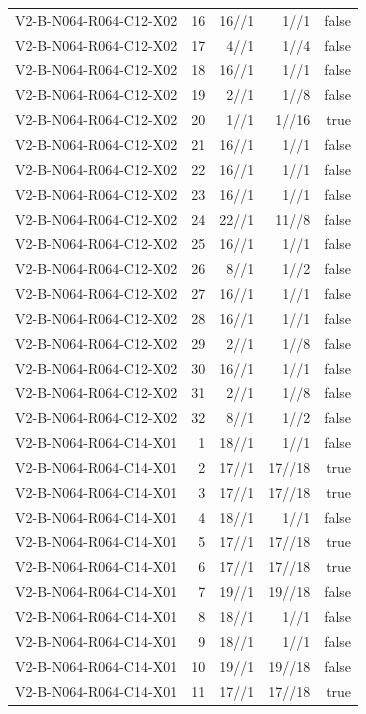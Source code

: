 {\begin{longtable}{lrrrr}
V2-B-N064-R064-C12-X02 & 16 & 16//1 & 1//1 & false \\
V2-B-N064-R064-C12-X02 & 17 & 4//1 & 1//4 & false \\
V2-B-N064-R064-C12-X02 & 18 & 16//1 & 1//1 & false \\
V2-B-N064-R064-C12-X02 & 19 & 2//1 & 1//8 & false \\
V2-B-N064-R064-C12-X02 & 20 & 1//1 & 1//16 & true \\
V2-B-N064-R064-C12-X02 & 21 & 16//1 & 1//1 & false \\
V2-B-N064-R064-C12-X02 & 22 & 16//1 & 1//1 & false \\
V2-B-N064-R064-C12-X02 & 23 & 16//1 & 1//1 & false \\
V2-B-N064-R064-C12-X02 & 24 & 22//1 & 11//8 & false \\
V2-B-N064-R064-C12-X02 & 25 & 16//1 & 1//1 & false \\
V2-B-N064-R064-C12-X02 & 26 & 8//1 & 1//2 & false \\
V2-B-N064-R064-C12-X02 & 27 & 16//1 & 1//1 & false \\
V2-B-N064-R064-C12-X02 & 28 & 16//1 & 1//1 & false \\
V2-B-N064-R064-C12-X02 & 29 & 2//1 & 1//8 & false \\
V2-B-N064-R064-C12-X02 & 30 & 16//1 & 1//1 & false \\
V2-B-N064-R064-C12-X02 & 31 & 2//1 & 1//8 & false \\
V2-B-N064-R064-C12-X02 & 32 & 8//1 & 1//2 & false \\
V2-B-N064-R064-C14-X01 & 1 & 18//1 & 1//1 & false \\
V2-B-N064-R064-C14-X01 & 2 & 17//1 & 17//18 & true \\
V2-B-N064-R064-C14-X01 & 3 & 17//1 & 17//18 & true \\
V2-B-N064-R064-C14-X01 & 4 & 18//1 & 1//1 & false \\
V2-B-N064-R064-C14-X01 & 5 & 17//1 & 17//18 & true \\
V2-B-N064-R064-C14-X01 & 6 & 17//1 & 17//18 & true \\
V2-B-N064-R064-C14-X01 & 7 & 19//1 & 19//18 & false \\
V2-B-N064-R064-C14-X01 & 8 & 18//1 & 1//1 & false \\
V2-B-N064-R064-C14-X01 & 9 & 18//1 & 1//1 & false \\
V2-B-N064-R064-C14-X01 & 10 & 19//1 & 19//18 & false \\
V2-B-N064-R064-C14-X01 & 11 & 17//1 & 17//18 & true \\

\end{longtable}}
